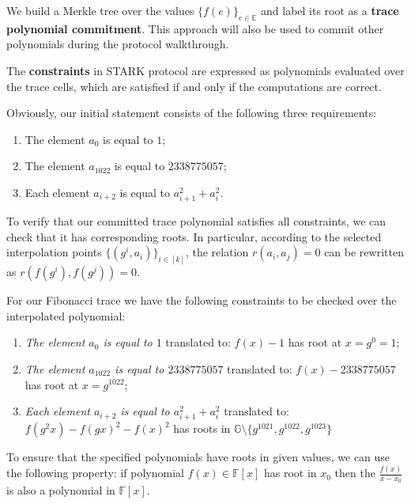 \documentclass[../lecture-notes-148x210.tex]{subfiles}
\begin{document}
We build a Merkle tree over the values $\{f(e)\}_{e \in \mathbb{E}}$ and label
its root as a \textbf{trace polynomial commitment}. This approach will also be
used to commit other polynomials during the protocol walkthrough.

The \textbf{constraints} in STARK protocol are expressed as polynomials
evaluated over the trace cells, which are satisfied if and only if the
computations are correct.

\begin{example}
Obviously, our initial statement consists of the following three requirements:
\begin{enumerate}
    \item The element $a_0$ is equal to $1$;
    \item The element $a_{1022}$ is equal to $2338775057$;
    \item Each element $a_{i+2}$ is equal to $a_{i+1}^2 + a_{i}^2$.
\end{enumerate}
\end{example}
To verify that our committed trace polynomial satisfies all constraints, we can
check that it has corresponding roots. In particular, according to the selected
interpolation points $\{(g^i, a_i)\}_{i \in [k]}$, the relation $r(a_i, a_j) =
0$ can be rewritten as $r(f(g^i), f(g^j)) = 0$.
\begin{example}
For our Fibonacci trace we have the following constraints to be checked over the interpolated polynomial:
\begin{enumerate}
    \item \textit{The element $a_0$ is equal to $1$} translated to: $f(x)-1$ has root at $x = g^0 = 1$;
    \item \textit{The element $a_{1022}$ is equal to $2338775057$} translated to: $f(x) - 2338775057$ has root at $x = g^{1022}$;
    \item \textit{Each element $a_{i+2}$ is equal to $a_{i+1}^2 + a_{i}^2$} translated to: $f(g^2x) - f(gx)^2 - f(x)^2$ has roots in $\mathbb{G} \setminus \{g^{1021}, g^{1022}, g^{1023}\}$
\end{enumerate}
\end{example}

To ensure that the specified polynomials have roots in given values, we can use the following property: if polynomial $f(x) \in \mathbb{F}[x]$ has root in $x_0$ then the $\frac{f(x)}{x - x_0}$ is also a polynomial in $\mathbb{F}[x]$.
\end{document}
